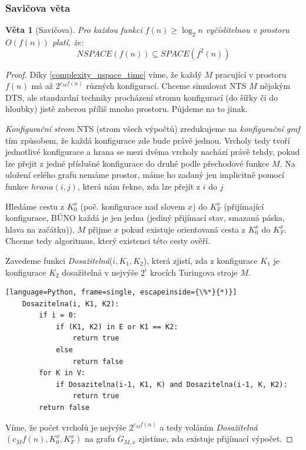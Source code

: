 \documentclass[11pt]{report} %
\newtheorem{theorem}{Věta}[section]
\numberwithin{equation}{section}
\begin{document}
\subsubsection{Savičova věta}
\begin{theorem}[Savičova]
Pro každou funkci $f(n) \geq \log_2n$ vyčíslitelnou v prostoru $O(f(n))$ platí, že:
	$$NSPACE(f(n)) \subseteq SPACE(f^2(n))$$
\end{theorem}
\begin{proof}
Díky \ref{complexity_nspace_time} víme, že každý $M$ pracující v prostoru $f(n)$ má až $2^{c_Mf(n)}$ různých konfigurací. Chceme simulovat NTS $M$ nějakým DTS, ale standardní techniky procházení stromu konfigurací (do šířky či do hloubky) jistě zaberou příliš mnoho prostoru. Půjdeme na to jinak.

\textit{Konfigurační strom} NTS (strom všech výpočtů) zredukujeme na \textit{konfigurační graf} tím způsobem, že každá konfigurace zde bude právě jednou. Vrcholy tedy tvoří jednotlivé konfigurace a hrana se mezi dvěma vrcholy nachází právě tehdy, pokud lze přejit z jedné příslušné konfigurace do druhé podle přechodové funkce $M$. Na uložení celého grafu nemáme prostor, máme ho zadaný jen implicitně pomocí funkce $hrana(i,j)$, která nám řekne, zda lze přejít z $i$ do $j$

Hledáme cestu z $K_0^x$ (poč. konfigurace nad slovem $x$) do $K_F^x$ (přijímající konfigurace, BÚNO každá je jen jedna (jediný přijímací stav, smazaná páska, hlava na začátku)). $M$ přijme $x$ pokud existuje orientovaná cesta z $K_0^x$ do $K_F^x$. Chceme tedy algoritmus, který existenci této cesty ověří. 

Zavedeme funkci \textit{Dosažitelná}($i,K_1,K_2$), která zjistí, zda z konfigurace $K_1$ je konfigurace $K_2$ dosažitelná
v nejvýše $2^i$ krocích Turingova stroje $M$.
\bigskip

\begin{minipage}{\linewidth}
	\begin{lstlisting}[language=Python, frame=single, escapeinside={\%*}{*)}]
	Dosazitelna(i, K1, K2):
		if i = 0:
			if (K1, K2) in E or K1 == K2:
				return true
			else
				return false
		for K in V:
			if Dosazitelna(i-1, K1, K) and Dosazitelna(i-1, K, K2):
				return true
		return false
	\end{lstlisting}
\end{minipage}

Víme, že počet vrcholů je nejvýše $2^{c_Mf(n)}$ a tedy voláním \textit{Dosažitelná}$(c_Mf(n), K_0^x, K_F^x)$ na grafu $G_{M,x}$ zjistíme, zda existuje přijímací výpočet.


\end{proof}
\end{document}
